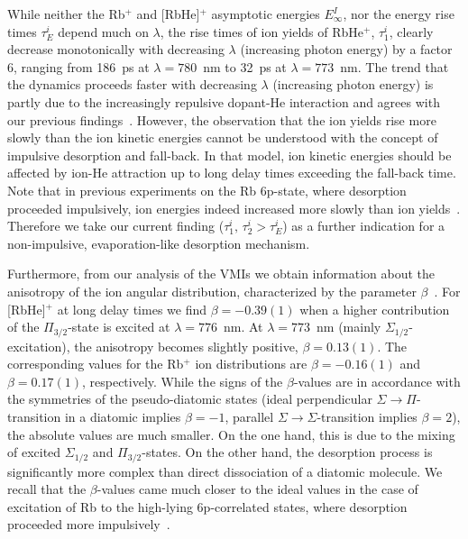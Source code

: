 While neither the Rb$^+$ and [RbHe]$^+$ asymptotic energies $E_\infty^I$, nor the energy rise times $\tau^i_E$ depend much on $\lambda$, the rise times of ion yields of RbHe$^{+}$, $\tau^i_1$, clearly decrease monotonically with decreasing $\lambda$ (increasing photon energy) by a factor $6$, ranging from 186~ps at $\lambda=780$~nm to 32~ps at $\lambda=773$~nm. The trend that the dynamics proceeds faster with decreasing $\lambda$ (increasing photon energy) is partly due to the increasingly repulsive dopant-He interaction and agrees with our previous findings~\cite{Vangerow:2015,Vangerow:2017}. However, the observation that the ion yields rise more slowly than the ion kinetic energies cannot be understood with the concept of impulsive desorption and fall-back. In that model, ion kinetic energies should be affected by ion-He attraction up to long delay times exceeding the fall-back time. Note that in previous experiments on the Rb 6p-state, where desorption proceeded impulsively, ion energies indeed increased more slowly than ion yields~\cite{Vangerow:2017}. Therefore we take our current finding ($\tau^i_1, \,\tau^i_2 > \tau^i_E$) as a further indication for a non-impulsive, evaporation-like desorption mechanism. 

Furthermore, from our analysis of the VMIs we obtain information about the anisotropy of the ion angular distribution, characterized by the parameter $\beta$~\cite{Zare:1972}. For [RbHe]$^+$ at long delay times we find $\beta=-0.39(1)$ when a higher contribution of the $\Pi_{3/2}$-state is excited at $\lambda=776$~nm. At $\lambda=773$~nm (mainly $\Sigma_{1/2}$-excitation), the anisotropy becomes slightly positive, $\beta=0.13(1)$. The corresponding values for the Rb$^+$ ion distributions are $\beta=-0.16(1)$ and $\beta=0.17(1)$, respectively. While the signs of the $\beta$-values are in accordance with the symmetries of the pseudo-diatomic states (ideal perpendicular $\Sigma\rightarrow\Pi$-transition in a diatomic implies $\beta=-1$, parallel $\Sigma\rightarrow\Sigma$-transition implies $\beta=2$), the absolute values are much smaller. On the one hand, this is due to the mixing of excited $\Sigma_{1/2}$ and $\Pi_{3/2}$-states. On the other hand, the desorption process is significantly more complex than direct dissociation of a diatomic molecule. We recall that the $\beta$-values came much closer to the ideal values in the case of excitation of Rb to the high-lying 6p-correlated states, where desorption proceeded more impulsively~\cite{Fechner:2012,Vangerow:2014,Vangerow:2017}. 

